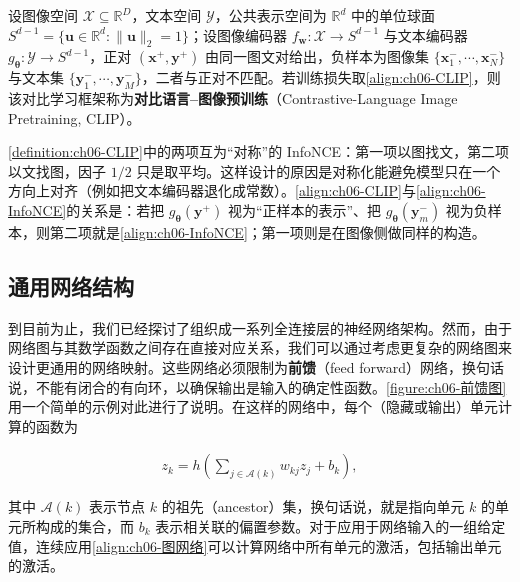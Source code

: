 \documentclass[../../main.tex]{subfiles}
\begin{document}
\begin{definition}[CLIP]\label{definition:ch06-CLIP}
设图像空间 $\mathcal{X}\subseteq\mathbb{R}^{D}$，文本空间 $\mathcal{Y}$，公共表示空间为 $\mathbb{R}^{d}$ 中的单位球面 $S^{d-1}=\{\boldsymbol{u}\in\mathbb{R}^{d}:\|\boldsymbol{u}\|_{2}=1\}$；设图像编码器 $f_{\boldsymbol{w}}:\mathcal{X}\to S^{d-1}$ 与文本编码器 $g_{\boldsymbol{\theta}}:\mathcal{Y}\to S^{d-1}$，正对 $(\boldsymbol{x}^{+},\boldsymbol{y}^{+})$ 由同一图文对给出，负样本为图像集 $\{\boldsymbol{x}_{1}^{-},\cdots,\boldsymbol{x}_{N}^{-}\}$ 与文本集 $\{\boldsymbol{y}_{1}^{-},\cdots,\boldsymbol{y}_{M}^{-}\}$，二者与正对不匹配。若训练损失取\eqref{align:ch06-CLIP}，则该对比学习框架称为\textbf{对比语言--图像预训练}（Contrastive-Language Image Pretraining, CLIP）。
\end{definition}

\begin{remark}\cref{definition:ch06-CLIP}中的两项互为“对称”的 InfoNCE：第一项以图找文，第二项以文找图，因子 $1/2$ 只是取平均。这样设计的原因是对称化能避免模型只在一个方向上对齐（例如把文本编码器退化成常数）。\eqref{align:ch06-CLIP}与\eqref{align:ch06-InfoNCE}的关系是：若把 $g_{\boldsymbol{\theta}}(\boldsymbol{y}^{+})$ 视为“正样本的表示”、把 $g_{\boldsymbol{\theta}}(\boldsymbol{y}_m^{-})$ 视为负样本，则第二项就是\eqref{align:ch06-InfoNCE}；第一项则是在图像侧做同样的构造。
\end{remark}

\subsection{通用网络结构}\label{subsection:ch06-通用网络结构}

到目前为止，我们已经探讨了组织成一系列全连接层的神经网络架构。然而，由于网络图与其数学函数之间存在直接对应关系，我们可以通过考虑更复杂的网络图来设计更通用的网络映射。这些网络必须限制为\textbf{前馈}（feed forward）网络，换句话说，不能有闭合的有向环，以确保输出是输入的确定性函数。\cref{figure:ch06-前馈图}用一个简单的示例对此进行了说明。在这样的网络中，每个（隐藏或输出）单元计算的函数为

\begin{align}
z_k=h\!\left(\sum_{j\in\mathcal{A}(k)}w_{kj}z_j+b_k\right),
\label{align:ch06-图网络}
\end{align}

其中 $\mathcal{A}(k)$ 表示节点 $k$ 的祖先（ancestor）集，换句话说，就是指向单元 $k$ 的单元所构成的集合，而 $b_k$ 表示相关联的偏置参数。对于应用于网络输入的一组给定值，连续应用\eqref{align:ch06-图网络}可以计算网络中所有单元的激活，包括输出单元的激活。
\end{document}
